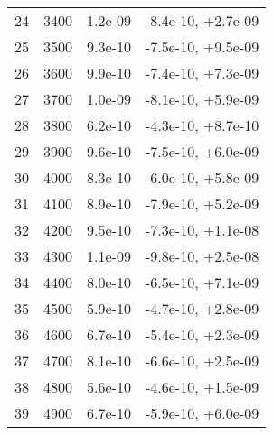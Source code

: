 \begin{table}
\begin{adjustbox}{width=1\textwidth/2}
\begin{tabular}{|c|c|c|c|}
\cline{1-4}
24 & 3400 & 1.2e-09 & -8.4e-10, +2.7e-09 \\
\cline{1-4}
25 & 3500 & 9.3e-10 & -7.5e-10, +9.5e-09 \\
\cline{1-4}
26 & 3600 & 9.9e-10 & -7.4e-10, +7.3e-09 \\
\cline{1-4}
27 & 3700 & 1.0e-09 & -8.1e-10, +5.9e-09 \\
\cline{1-4}
28 & 3800 & 6.2e-10 & -4.3e-10, +8.7e-10 \\
\cline{1-4}
29 & 3900 & 9.6e-10 & -7.5e-10, +6.0e-09 \\
\cline{1-4}
30 & 4000 & 8.3e-10 & -6.0e-10, +5.8e-09 \\
\cline{1-4}
31 & 4100 & 8.9e-10 & -7.9e-10, +5.2e-09 \\
\cline{1-4}
32 & 4200 & 9.5e-10 & -7.3e-10, +1.1e-08 \\
\cline{1-4}
33 & 4300 & 1.1e-09 & -9.8e-10, +2.5e-08 \\
\cline{1-4}
34 & 4400 & 8.0e-10 & -6.5e-10, +7.1e-09 \\
\cline{1-4}
35 & 4500 & 5.9e-10 & -4.7e-10, +2.8e-09 \\
\cline{1-4}
36 & 4600 & 6.7e-10 & -5.4e-10, +2.3e-09 \\
\cline{1-4}
37 & 4700 & 8.1e-10 & -6.6e-10, +2.5e-09 \\
\cline{1-4}
38 & 4800 & 5.6e-10 & -4.6e-10, +1.5e-09 \\
\cline{1-4}
39 & 4900 & 6.7e-10 & -5.9e-10, +6.0e-09 \\
\cline{1-4}
\end{tabular}
\end{adjustbox}
\end{table}

